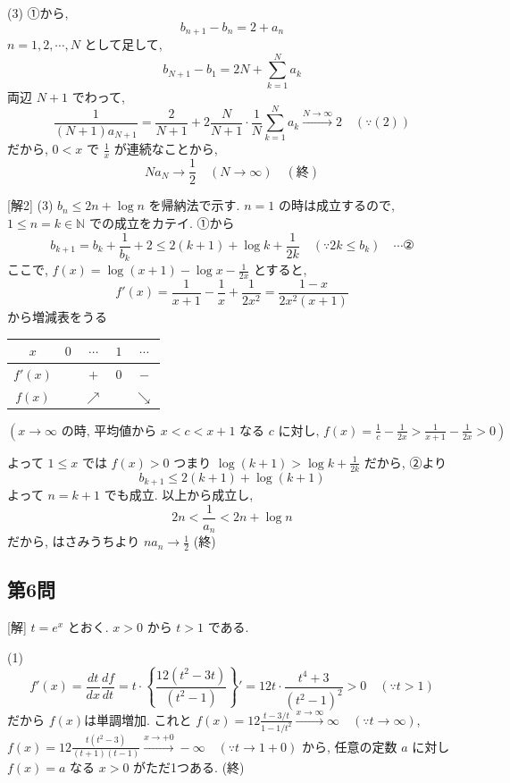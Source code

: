 \documentclass[../main.tex]{subfiles}
\begin{document}
(3) ①から,
\[ b_{n+1} - b_n = 2 + a_n \]
$n=1, 2, \cdots, N$ として足して,
\[ b_{N+1} - b_1 = 2N + \sum_{k=1}^N a_k \]
両辺 $N+1$ でわって,
\[ \frac{1}{(N+1)a_{N+1}} = \frac{2}{N+1} + 2\frac{N}{N+1} \cdot \frac{1}{N} \sum_{k=1}^N a_k \xrightarrow{N \to \infty} 2 \quad (\because (2)) \]
だから, $0 < x$ で $\frac{1}{x}$ が連続なことから,
\[ N a_N \to \frac{1}{2} \quad (N \to \infty) \quad (\text{終}) \]

[解2]
(3) $b_n \le 2n + \log n$ を帰納法で示す. $n=1$ の時は成立するので, $1 \le n = k \in \mathbb{N}$ での成立をカテイ. ①から
\[ b_{k+1} = b_k + \frac{1}{b_k} + 2 \le 2(k+1) + \log k + \frac{1}{2k} \quad (\because 2k \le b_k) \quad \cdots \text{②} \]
ここで, $f(x) = \log(x+1) - \log x - \frac{1}{2x}$ とすると,
\[ f'(x) = \frac{1}{x+1} - \frac{1}{x} + \frac{1}{2x^2} = \frac{1-x}{2x^2(x+1)} \]
から増減表をうる
\begin{center}
  \begin{tabular}{|c|c|c|c|c|}
    \hline
    $x$ & $0$ & $\cdots$ & $1$ & $\cdots$ \\ \hline
    $f'(x)$ & & $+$ & $0$ & $-$ \\ \hline
    $f(x)$ & & $\nearrow$ & & $\searrow$ \\ \hline
  \end{tabular}
\end{center}
$\left( \text{$x \to \infty$ の時, 平均値から $x < c < x+1$ なる $c$ に対し, } f(x) = \frac{1}{c} - \frac{1}{2x} > \frac{1}{x+1} - \frac{1}{2x} > 0 \right)$

よって $1 \le x$ では $f(x) > 0$ つまり $\log(k+1) > \log k + \frac{1}{2k}$ だから, ②より
\[ b_{k+1} \le 2(k+1) + \log(k+1) \]
よって $n=k+1$ でも成立. 以上から成立し,
\[ 2n < \frac{1}{a_n} < 2n + \log n \]
だから, はさみうちより $n a_n \to \frac{1}{2}$ (終)

\subsection*{第6問}
[解] $t = e^x$ とおく. $x > 0$ から $t > 1$ である.

(1)
\[ f'(x) = \frac{dt}{dx} \frac{df}{dt} = t \cdot \left\{ \frac{12(t^2 - 3t)}{(t^2 - 1)} \right\}' = 12t \cdot \frac{t^4 + 3}{(t^2 - 1)^2} > 0 \quad (\because t > 1) \]
だから $f(x)$は単調増加. これと $f(x) = 12 \frac{t - 3/t}{1 - 1/t^2} \xrightarrow{x \to \infty} \infty \quad (\because t \to \infty)$,
$f(x) = 12 \frac{t(t^2 - 3)}{(t+1)(t-1)} \xrightarrow{x \to +0} -\infty \quad (\because t \to 1+0)$ から, 任意の定数 $a$ に対し $f(x) = a$ なる $x > 0$ がただ1つある. (終)
\end{document}
